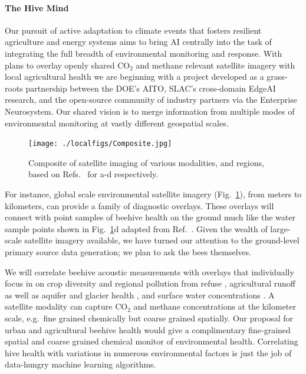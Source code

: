 \paragraph{The Hive Mind}
Our pursuit of active adaptation to climate events that fosters resilient agriculture and energy systems aims to bring AI centrally into the task of integrating the full breadth of environmental monitoring and response. 
With plans to overlay openly shared CO$_2$ and methane relevant satellite imagery with local agricultural health we are beginning with a project developed as a grass-roots partnership between the DOE's AITO, SLAC's cross-domain EdgeAI research, and the open-source community of industry partners via the Enterprise Neurosystem.
Our shared vision is to merge information from multiple modes of environmental monitoring at vastly different geospatial scales.

\begin{figure}
	\centerline{
		\texttt{[image: ./localfigs/Composite.jpg]}
		}
		\vspace{-1\baselineskip}
	\caption{\label{fig::composite}
		Composite of satellite imaging of various modalities, and regions, based on Refs.~\cite{YaraGlaciers,TomasBeaches,GlobalCO2,SurfaceWater} for a-d respectively.
		}
\end{figure}

For instance, global scale environmental satellite imagery (Fig.~\ref{fig::composite}), from meters to kilometers, can provide a family of diagnostic overlays.
These overlays will connect with point samples of beehive health on the ground much like the water sample points shown in Fig.~\ref{fig::composite}d adapted from Ref.~\cite{SurfaceWater}.
Given the wealth of large-scale satellite imagery available, we have turned our attention to the ground-level primary source data generation; we plan to ask the bees themselves.

We will correlate beehive acoustic measurements with overlays that individually focus in on crop diversity and regional pollution from refuse \cite{TomasBeaches}, agricultural runoff \cite{NeonicsOnBees} as well as aquifer \cite{GRACE_CongoBasinWatershed} and glacier health \cite{YaraGlaciers}, and surface water concentrations \cite{SurfaceWater}. 
A satellite modality can capture CO$_2$ \cite{GlobalCO2} and methane \cite{MethaneEmission2022} concentrations at the kilometer scale, e.g.~fine grained chemically but coarse grained spatially.
Our proposal for urban and agricultural beehive health would give a complimentary fine-grained spatial and coarse grained chemical monitor of environmental health.
Correlating hive health with variations in numerous environmental factors is just the job of data-hungry machine learning algorithms. 


